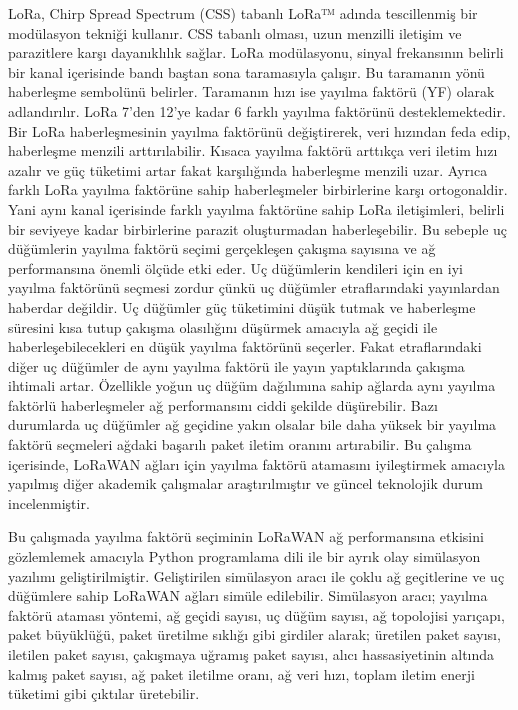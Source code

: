 LoRa, Chirp Spread Spectrum (CSS) tabanlı LoRa™ adında tescillenmiş bir modülasyon tekniği kullanır. CSS tabanlı olması, uzun menzilli iletişim ve parazitlere karşı dayanıklılık sağlar. LoRa modülasyonu, sinyal frekansının belirli bir kanal içerisinde bandı baştan sona taramasıyla çalışır. Bu taramanın yönü haberleşme sembolünü belirler. Taramanın hızı ise yayılma faktörü (YF) olarak adlandırılır. LoRa 7'den 12'ye kadar 6 farklı yayılma faktörünü desteklemektedir. Bir LoRa haberleşmesinin yayılma faktörünü değiştirerek, veri hızından feda edip, haberleşme menzili arttırılabilir. Kısaca yayılma faktörü arttıkça veri iletim hızı azalır ve güç tüketimi artar fakat karşılığında haberleşme menzili uzar. Ayrıca farklı LoRa yayılma faktörüne sahip haberleşmeler birbirlerine karşı ortogonaldir. Yani aynı kanal içerisinde farklı yayılma faktörüne sahip LoRa iletişimleri, belirli bir seviyeye kadar birbirlerine parazit oluşturmadan haberleşebilir. Bu sebeple uç düğümlerin yayılma faktörü seçimi gerçekleşen çakışma sayısına ve ağ performansına önemli ölçüde etki eder. Uç düğümlerin kendileri için en iyi yayılma faktörünü seçmesi zordur çünkü uç düğümler etraflarındaki yayınlardan haberdar değildir. Uç düğümler güç tüketimini düşük tutmak ve haberleşme süresini kısa tutup çakışma olasılığını düşürmek amacıyla ağ geçidi ile haberleşebilecekleri en düşük yayılma faktörünü seçerler. Fakat etraflarındaki diğer uç düğümler de aynı yayılma faktörü ile yayın yaptıklarında çakışma ihtimali artar. Özellikle yoğun uç düğüm dağılımına sahip ağlarda aynı yayılma faktörlü haberleşmeler ağ performansını ciddi şekilde düşürebilir. Bazı durumlarda uç düğümler ağ geçidine yakın olsalar bile daha yüksek bir yayılma faktörü seçmeleri ağdaki başarılı paket iletim oranını artırabilir. Bu çalışma içerisinde, LoRaWAN ağları için yayılma faktörü atamasını iyileştirmek amacıyla yapılmış diğer akademik çalışmalar araştırılmıştır ve güncel teknolojik durum incelenmiştir.

Bu çalışmada yayılma faktörü seçiminin LoRaWAN ağ performansına etkisini gözlemlemek amacıyla Python programlama dili ile bir ayrık olay simülasyon yazılımı geliştirilmiştir. Geliştirilen simülasyon aracı ile çoklu ağ geçitlerine ve uç düğümlere sahip LoRaWAN ağları simüle edilebilir. Simülasyon aracı; yayılma faktörü ataması yöntemi, ağ geçidi sayısı, uç düğüm sayısı, ağ topolojisi yarıçapı, paket büyüklüğü, paket üretilme sıklığı gibi girdiler alarak; üretilen paket sayısı, iletilen paket sayısı, çakışmaya uğramış paket sayısı, alıcı hassasiyetinin altında kalmış paket sayısı, ağ paket iletilme oranı, ağ veri hızı, toplam iletim enerji tüketimi gibi çıktılar üretebilir. 


